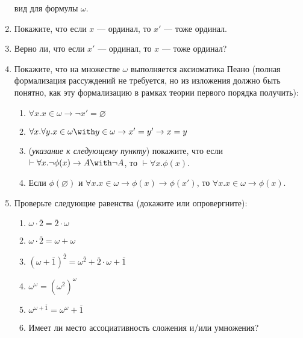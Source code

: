 \documentclass[10pt,a4paper,oneside]{article}
\begin{document}
\begin{enumerate}
вид для формулы $\omega$.
\item Покажите, что если $x$ --- ординал, то $x'$ --- тоже ординал.
\item Верно ли, что если $x'$ --- ординал, то $x$ --- тоже ординал?
\item Покажите, что на множестве $\omega$ выполняется аксиоматика Пеано (полная формализация рассуждений не требуется,
но из изложения должно быть понятно, как эту формализацию в рамках теории первого порядка получить):
\begin{enumerate}
\item $\forall x.x \in \omega \rightarrow \neg x' = \varnothing$
\item $\forall x.\forall y.x \in \omega \with y \in \omega \rightarrow x' = y' \rightarrow x = y$
\item (\emph{указание к следующему пункту}) покажите, что если $\vdash\forall x.\neg\phi(x)\rightarrow A\with\neg A$, то $\vdash\forall x.\phi(x)$.
\item Если $\phi(\varnothing)$ и $\forall x.x \in \omega \rightarrow \phi(x) \rightarrow \phi(x')$, 
то $\forall x.x \in \omega \rightarrow \phi(x)$.
\end{enumerate}
\item Проверьте следующие равенства (докажите или опровергните):
\begin{enumerate}
\item $\omega\cdot\overline{2} = \overline{2}\cdot\omega$
\item $\omega\cdot\overline{2} = \omega + \omega$
\item $(\omega+\overline{1})^{\overline{2}} = \omega^{\overline{2}} + \overline{2}\cdot \omega + \overline{1}$
\item $\omega ^ \omega = (\omega ^ {\overline{2}}) ^ \omega$
\item $\omega ^ {\omega + \overline{1}} = \omega ^ \omega + \overline{1}$
\item Имеет ли место ассоциативность сложения и/или умножения?
\end{enumerate}
\end{enumerate}
\end{document}

